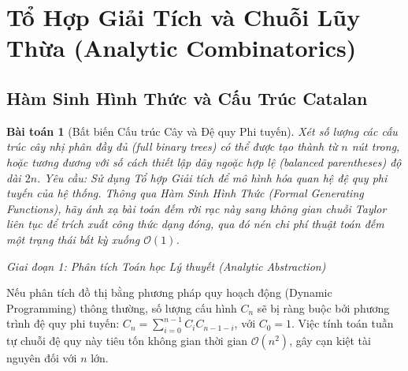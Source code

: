 \documentclass{article}
\newtheorem{baitoan}{Bài toán}
\begin{document}


\section{Tổ Hợp Giải Tích và Chuỗi Lũy Thừa (Analytic Combinatorics)}
\subsection{Hàm Sinh Hình Thức và Cấu Trúc Catalan}

\begin{baitoan}[Bất biến Cấu trúc Cây và Đệ quy Phi tuyến]
Xét số lượng các cấu trúc cây nhị phân đầy đủ (full binary trees) có thể được tạo thành từ $n$ nút trong, hoặc tương đương với số cách thiết lập dãy ngoặc hợp lệ (balanced parentheses) độ dài $2n$. Yêu cầu: Sử dụng Tổ hợp Giải tích để mô hình hóa quan hệ đệ quy phi tuyến của hệ thống. Thông qua Hàm Sinh Hình Thức (Formal Generating Functions), hãy ánh xạ bài toán đếm rời rạc này sang không gian chuỗi Taylor liên tục để trích xuất công thức dạng đóng, qua đó nén chi phí thuật toán đếm một trạng thái bất kỳ xuống $\mathcal{O}(1)$.
\end{baitoan}

\vspace{0.5em}\noindent\emph{Giai đoạn 1: Phân tích Toán học Lý thuyết (Analytic Abstraction)}

Nếu phân tích đồ thị bằng phương pháp quy hoạch động (Dynamic Programming) thông thường, số lượng cấu hình $C_n$ sẽ bị ràng buộc bởi phương trình đệ quy phi tuyến: $C_n = \sum_{i=0}^{n-1} C_i C_{n-1-i}$, với $C_0 = 1$. Việc tính toán tuần tự chuỗi đệ quy này tiêu tốn không gian thời gian $\mathcal{O}(n^2)$, gây cạn kiệt tài nguyên đối với $n$ lớn.
\end{document}
